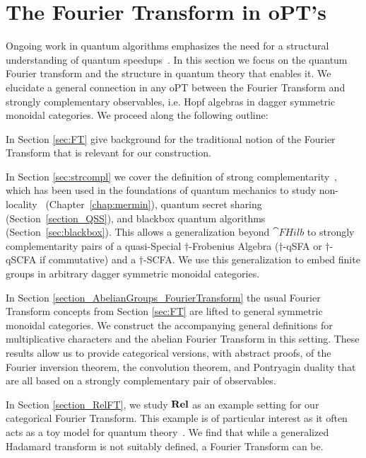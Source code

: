 \section{The Fourier Transform in oPT's}
\label{sec:strcomplFT}

Ongoing work in quantum algorithms emphasizes the need for a structural understanding of quantum speedups~\cite{aaronson2014need}. In this section we focus on the quantum Fourier transform and the structure in quantum theory that enables it. We elucidate a general connection in any oPT between the Fourier Transform and strongly complementary observables, i.e. Hopf algebras in dagger symmetric monoidal categories. We proceed along the following outline:

In Section \ref{sec:FT} give background for the traditional notion of the Fourier Transform that is relevant for our construction.  

In Section \ref{sec:strcompl} we cover the definition of strong complementarity~\cite{coecke2011interacting}, which has been used in the foundations of quantum mechanics to study non-locality~\cite{coecke2012strong, gogioso2015mermin} (Chapter~\ref{chap:mermin}), quantum secret sharing~\cite{gogioso2015mermin, zamdzhiev2012abstract} (Section~\ref{section_QSS}), and blackbox quantum algorithms~\cite{vicary-tqa, zeng2014abstract, zeng2015models} (Section~\ref{sec:blackbox}). This allows a generalization beyond $\cat{FHilb}$ to strongly complementarity pairs of a quasi-Special $\dagger$-Frobenius Algebra ($\dagger$-qSFA or $\dagger$-qSCFA if commutative) and a $\dagger$-SCFA. We use this generalization to embed finite groups in arbitrary dagger symmetric monoidal categories.

In Section \ref{section_AbelianGroups_FourierTransform} the usual Fourier Transform concepts from Section \ref{sec:FT} are lifted to general symmetric monoidal categories. We construct the accompanying general definitions for multiplicative characters and the abelian Fourier Transform in this setting.  These results allow us to provide categorical versions, with abstract proofs, of the Fourier inversion theorem, the convolution theorem, and Pontryagin duality that are all based on a strongly complementary pair of observables.

In Section \ref{section_RelFT}, we study $\mathbf{Rel}$ as an example setting for our categorical Fourier Transform. This example is of particular interest as it often acts as a toy model for quantum theory~\cite{evans2009classifying, cqm-notes, pavlovic2009quantum, zeng2015models}.  We find that while a generalized Hadamard transform is not suitably defined, a Fourier Transform can be.

